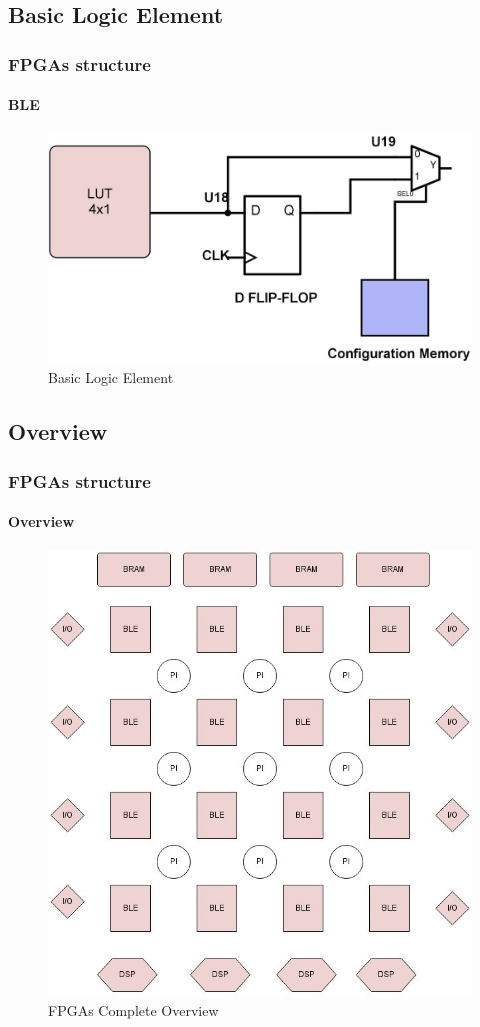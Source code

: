 \documentclass{beamer}
\begin{document}
\begin{frame}
\subsection{Basic Logic Element}
\frametitle{FPGAs structure}
\framesubtitle{BLE}

\begin{figure}
\includegraphics[width=.9\linewidth,left]{lutBLE.jpg}
\caption{Basic Logic Element}
\end{figure}

\end{frame}
\begin{frame}
\subsection{Overview}
\frametitle{FPGAs structure}
\framesubtitle{Overview}

\begin{figure}
\includegraphics[width=.58\linewidth,center]{full.jpg}
\caption{FPGAs Complete Overview}
\end{figure}

\end{frame}
\end{document}
